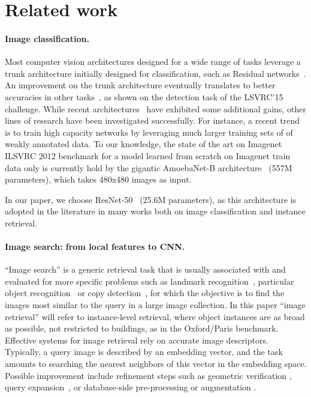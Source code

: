 %
\section{Related work}
\label{sec:related}
%
\paragraph{Image classification.} 
Most computer vision architectures designed for a wide range of tasks leverage a trunk architecture initially designed for classification, such as Residual networks~\cite{he16resnet}. An improvement on the trunk architecture eventually translates to better accuracies in other tasks~\cite{he2017mask}, as shown on the detection task of the LSVRC'15 challenge. While recent architectures~\cite{hu2018squeeze,huang2017densely,Xie2017AggregatedRT} have exhibited some additional gains, other lines of research have been investigated successfully. For instance, a recent trend~\cite{mahajan2018exploring} is to train high capacity networks by leveraging much larger training sets of of weakly annotated data. 
To our knowledge, the state of the art on Imagenet ILSVRC 2012 benchmark for a model learned from scratch on Imagenet train data only is currently hold by the gigantic AmoebaNet-B architecture~\cite{huang2018gpipe} (557M parameters), which takes 480x480 images as input. 

In our paper, we choose ResNet-50~\cite{he16resnet} (25.6M parameters), as this architecture is adopted in the literature in many works both on image classification and instance retrieval. 

\paragraph{Image search: from local features to CNN.} 
``Image search'' is a generic retrieval task that is usually associated with and evaluated for more specific problems such as landmark recognition~\cite{Jegou2008HammingEA,Philbin07}, particular object recognition~\cite{nister2006scalable} or copy detection~\cite{Douze2009EvaluationOG}, for which the objective is to find the images most similar to the query in a large image collection. 
In this paper ``image retrieval'' will refer to instance-level retrieval, where object instances are as broad as possible, \ie not restricted to buildings, as in the Oxford/Paris benchmark.
%
Effective systems for image retrieval rely on accurate image descriptors.  
Typically, a query image is described by an embedding vector, and the task amounts to searching the nearest neighbors of this vector in the embedding space. Possible improvement include refinement steps such as geometric verification \cite{Philbin07}, query expansion~\cite{chum2007total,TOLIAS20143466}, or database-side pre-processing or augmentation \cite{tolias2016image,turcot2009better}. 

